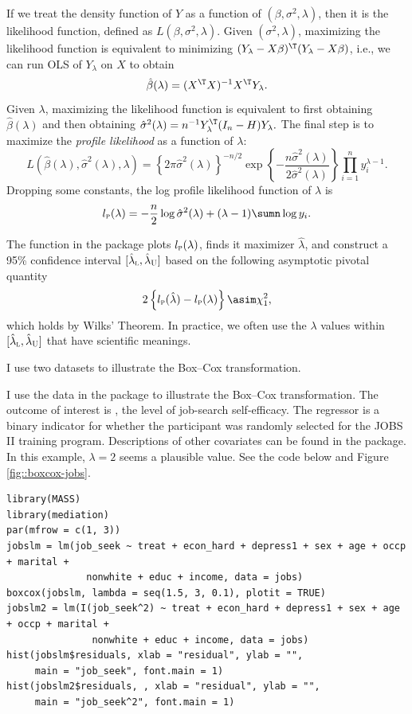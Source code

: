 If we treat the density function of $Y$ as a function of $(\beta,\sigma^{2},\lambda)$,
then it is the likelihood function, defined as $L(\beta,\sigma^{2},\lambda).$
Given $(\sigma^{2},\lambda)$, maximizing the likelihood function
is equivalent to minimizing $(Y_{\lambda}-X\beta)^{\T}(Y_{\lambda}-X\beta)$,
i.e., we can run OLS of $Y_{\lambda}$ on $X$ to obtain 
\[
\hat{\beta}(\lambda)=(X^{\T}X)^{-1}X^{\T}Y_{\lambda}.
\]
Given $\lambda$, maximizing the likelihood function is equivalent
to first obtaining $\hat{\beta}(\lambda)$ and then obtaining $\hat{\sigma}^{2}(\lambda)=n^{-1}Y_{\lambda}^{\T} (I_{n}-H)Y_{\lambda}.$
The final step is to maximize the {\it profile likelihood} as a function
of $\lambda$:
\[
L(\hat{\beta}(\lambda),\hat{\sigma}^{2}(\lambda),\lambda)=\left\{ 2\pi\hat{\sigma}^{2}(\lambda)\right\} ^{-n/2}\exp\left\{ -\frac{n\hat{\sigma}^{2}(\lambda)}{2\hat{\sigma}^{2}(\lambda)}\right\} \prod_{i=1}^{n}y_{i}^{\lambda-1}.
\]
Dropping some constants, the log profile likelihood function of $\lambda$
is
\[
l_{\textsc{p}}(\lambda)=-\frac{n}{2}\log\hat{\sigma}^{2}(\lambda)+(\lambda-1)\sumn\log y_{i}.
\]


The  function in the   package  plots $l_{\textsc{p}}(\lambda)$, finds it
maximizer $\hat{\lambda}$, and construct a 95\% confidence
interval $[\hat{\lambda}_{\textsc{l}},\hat{\lambda}_{\textsc{U}}]$
based on the following asymptotic pivotal quantity
\[
2\left\{ l_{\textsc{p}}(\hat{\lambda})-l_{\textsc{p}}(\lambda)\right\} \asim\chi_{1}^{2},
\]
which holds by Wilks' Theorem. In practice, we often use the $\lambda$
values within $[\hat{\lambda}_{\textsc{l}},\hat{\lambda}_{\textsc{U}}]$
that have scientific meanings.


I use two datasets to illustrate the Box--Cox transformation. 

\begin{example}
I use the  data in the  package \citep{tingley2014mediation} to illustrate the Box--Cox transformation. The outcome of interest is , the level of job-search self-efficacy. 
The regressor  is a binary indicator for whether the participant was randomly selected for the JOBS II training program.
Descriptions of other covariates can be found in the  package. 
In this example, $\lambda = 2$ seems a plausible value. See the  code below and Figure \ref{fig::boxcox-jobs}. 
\end{example}


\begin{lstlisting}
library(MASS)
library(mediation)
par(mfrow = c(1, 3))
jobslm = lm(job_seek ~ treat + econ_hard + depress1 + sex + age + occp + marital + 
              nonwhite + educ + income, data = jobs)
boxcox(jobslm, lambda = seq(1.5, 3, 0.1), plotit = TRUE)
jobslm2 = lm(I(job_seek^2) ~ treat + econ_hard + depress1 + sex + age + occp + marital + 
               nonwhite + educ + income, data = jobs)
hist(jobslm$residuals, xlab = "residual", ylab = "", 
     main = "job_seek", font.main = 1)
hist(jobslm2$residuals, , xlab = "residual", ylab = "", 
     main = "job_seek^2", font.main = 1)
\end{lstlisting}

